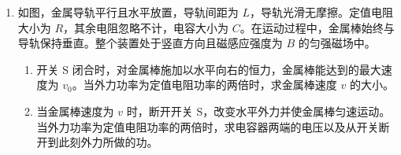 \documentclass[\gkver]{gaokaozhenti}
\begin{document}
\begin{enumerate}
{$x_{1} = \frac{1}{2}at_{1}^{2} = 100 \Um$

设在 $t_{3}$ 时刻停止鸣笛，根据题意可得

$\frac{(t_{3} - t_{1}) \times 20 + 100}{v_{0}} + t_{3} = t_{2}$

停止鸣笛时救护车距出发处的距离

$x = x_{1} + (t_{3} - t_{1}) \times v$

代入数据联立解得

$x = 680 \Um$
}

\item
如图，金属导轨平行且水平放置，导轨间距为 $L$，导轨光滑无摩擦。定值电阻大小为 $R$，其余电阻忽略不计，电容大小为 $C$。在运动过程中，金属棒始终与导轨保持垂直。整个装置处于竖直方向且磁感应强度为 $B$ 的匀强磁场中。
\begin{enumerate}
	\item
	开关 S 闭合时，对金属棒施加以水平向右的恒力，金属棒能达到的最大速度为 $v_{0}$。当外力功率为定值电阻功率的两倍时，求金属棒速度 $v$ 的大小。
	\item
	当金属棒速度为 $v$ 时，断开开关 S，改变水平外力并使金属棒匀速运动。当外力功率为定值电阻功率的两倍时，求电容器两端的电压以及从开关断开到此刻外力所做的功。
\end{enumerate}


\end{enumerate}
\end{document}
